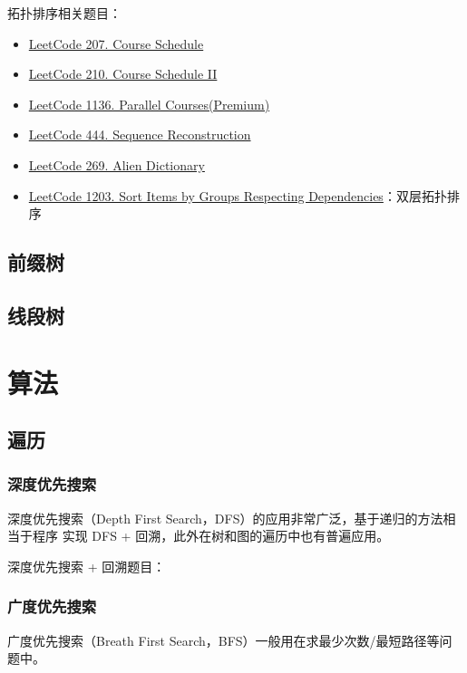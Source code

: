 拓扑排序相关题目：
\begin{itemize}
  \item
    \href{https://leetcode.com/problems/course-schedule/}{LeetCode 207. Course Schedule}
  \item
    \href{https://leetcode.com/problems/course-schedule-ii/}{LeetCode 210. Course Schedule II}
  \item
    \href{https://leetcode.com/problems/parallel-courses}{LeetCode 1136. Parallel Courses(Premium)}
  \item
    \href{https://leetcode.com/problems/sequence-reconstruction}{LeetCode 444.
      Sequence Reconstruction}
  \item
    \href{https://leetcode.com/problems/alien-dictionary}{LeetCode 269. Alien Dictionary}
  \item
    \href{https://leetcode.com/problems/sort-items-by-groups-respecting-dependencies/}{LeetCode
      1203. Sort Items by Groups Respecting Dependencies}：双层拓扑排序
\end{itemize}

\section{前缀树}

\section{线段树}

\chapter{算法}
\section{遍历}
\subsection{深度优先搜索}
深度优先搜索（Depth First Search，DFS）的应用非常广泛，基于递归的方法相当于程序
实现 DFS + 回溯，此外在树和图的遍历中也有普遍应用。

深度优先搜索 + 回溯题目：

\subsection{广度优先搜索}
广度优先搜索（Breath First Search，BFS）一般用在求最少次数/最短路径等问题中。

